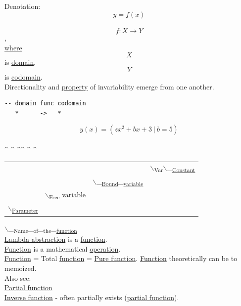 \documentclass[11pt]{article}
\begin{document}
Denotation:\\
$$ y = f(x) $$\\
$$ f: X \to Y $$,\\
\hyperref[orgefd1ecd]{where} $$ X $$ is \hyperref[orgf784585]{domain}, $$ Y $$ is \hyperref[orgee70232]{codomain}.\\

Directionality and \hyperref[org07ca26b]{property} of invariability emerge from one another.\\
\begin{verbatim}
-- domain func codomain
   *      ->   *
\end{verbatim}

$$ y(x) = (zx^{2} + bx + 3 \ | \ b = 5) $$\\
\^{} \^{}    \^{}\^{}    \^{}   \^{}\\
\begin{center}
\begin{tabular}{llll}
 &  &  & $\backslash$\textsubscript{Var}$\backslash$_\textsubscript{\hyperref[org6cc4f99]{Constant}}\\
 &  & $\backslash$_\textsubscript{\hyperref[org7d65bda]{Bound}}\_\textsubscript{\hyperref[org301bab5]{variable}}\\
 & $\backslash$\textsubscript{Free} \hyperref[org301bab5]{variable}\\
$\backslash$\textsubscript{\hyperref[org45d4a16]{Parameter}}\\
\end{tabular}
\end{center}
$\backslash$_\textsubscript{Name}\_\textsubscript{of}\_\textsubscript{the}\_\textsubscript{\hyperref[orgeb5cddb]{function}}\\

\hyperref[orgeed9735]{Lambda abstraction} is a \hyperref[orgeb5cddb]{function}.\\
\hyperref[orgeb5cddb]{Function} is a mathematical \hyperref[org87d485b]{operation}.\\

\hyperref[orgeb5cddb]{Function} = Total \hyperref[orgeb5cddb]{function} = \hyperref[org801b478]{Pure function}. \hyperref[orgeb5cddb]{Function} theoretically can be to memoized.\\

Also see:\\
\hyperref[org90143aa]{Partial function}\\
\hyperref[org47c04f0]{Inverse function} - often partially exists (\hyperref[org90143aa]{partial function}).\\
\end{document}

